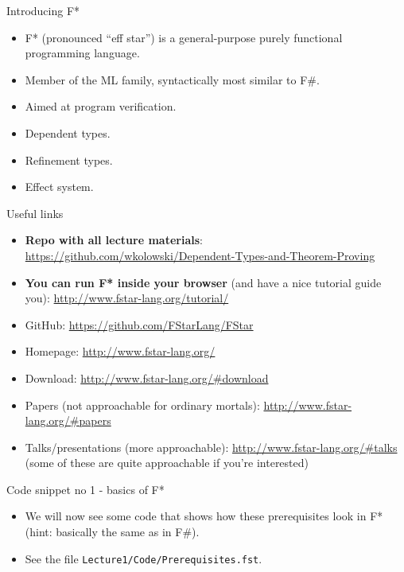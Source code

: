 \documentclass{beamer}
\begin{document}
\frame{\tableofcontents}

\begin{frame}{Introducing F*}
\begin{itemize}
	\item F* (pronounced ``eff star'') is a general-purpose purely functional programming language.
	\item Member of the ML family, syntactically most similar to F\#.
	\item Aimed at program verification.
	\item Dependent types.
	\item Refinement types.
	\item Effect system.
\end{itemize}
\end{frame}

\begin{frame}{Useful links}
\begin{itemize}
	\item \textbf{Repo with all lecture materials}: \url{https://github.com/wkolowski/Dependent-Types-and-Theorem-Proving}
	\item \textbf{You can run F* inside your browser} (and have a nice tutorial guide you): \url{http://www.fstar-lang.org/tutorial/}
	\item GitHub: \url{https://github.com/FStarLang/FStar}
	\item Homepage: \url{http://www.fstar-lang.org/}
	\item Download: \url{http://www.fstar-lang.org/\#download}
	\item Papers (not approachable for ordinary mortals): \url{http://www.fstar-lang.org/\#papers}
	\item Talks/presentations (more approachable): \url{http://www.fstar-lang.org/\#talks} (some of these are quite approachable if you're interested)  
\end{itemize}
\end{frame}

\begin{frame}{Code snippet no 1 - basics of F*}
\begin{itemize}
	\item We will now see some code that shows how these prerequisites look in F* (hint: basically the same as in F\#).
	\item See the file \texttt{Lecture1/Code/Prerequisites.fst}.
\end{itemize}
\end{frame}
\end{document}
